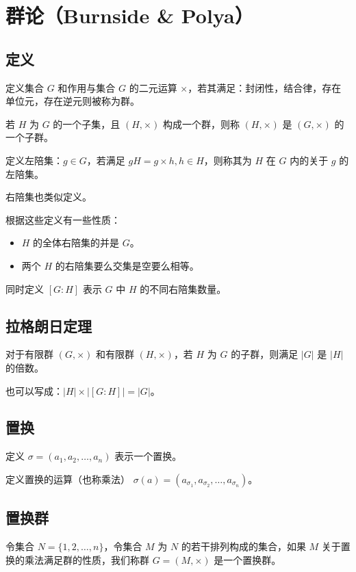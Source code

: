 \section{群论（Burnside \& Polya）}

\subsection{定义}

定义集合 $G$ 和作用与集合 $G$ 的二元运算 $\times$，若其满足：封闭性，结合律，存在单位元，存在逆元则被称为群。

若 $H$ 为 $G$ 的一个子集，且 $(H,\times)$ 构成一个群，则称 $(H,\times)$ 是 $(G,\times)$ 的一个子群。

定义左陪集：$g \in G$，若满足 $gH=g \times h,h \in H$，则称其为 $H$ 在 $G$ 内的关于 $g$ 的左陪集。

右陪集也类似定义。

根据这些定义有一些性质：

\begin{itemize}
    \item $H$ 的全体右陪集的并是 $G$。
    \item 两个 $H$ 的右陪集要么交集是空要么相等。
\end{itemize}

同时定义 $[G:H]$ 表示 $G$ 中 $H$ 的不同右陪集数量。

\subsection{拉格朗日定理}

对于有限群 $(G,\times)$ 和有限群 $(H,\times)$，若 $H$ 为 $G$ 的子群，则满足 $|G|$ 是 $|H|$ 的倍数。

也可以写成：$|H| \times |[G:H]|=|G|$。

\subsection{置换}

定义 $\sigma=(a_1,a_2,\dots,a_n)$ 表示一个置换。

定义置换的运算（也称乘法） $\sigma(a)=(a_{\sigma_1},a_{\sigma_2},\dots,a_{\sigma_n})$。

\subsection{置换群}

令集合 $N=\{1,2,\dots,n\}$，令集合 $M$ 为 $N$ 的若干排列构成的集合，如果 $M$ 关于置换的乘法满足群的性质，我们称群 $G=(M,\times)$ 是一个置换群。

